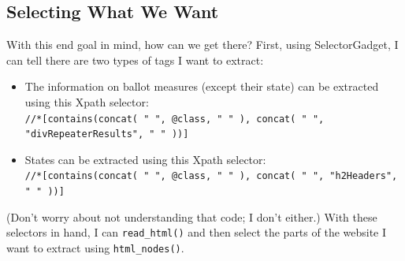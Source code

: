 \documentclass{article}\usepackage[]{graphicx}\usepackage[]{color}
\begin{document}
\subsection{Selecting What We Want}

With this end goal in mind, how can we get there? First, using SelectorGadget, I can tell there are two types of tags I want to extract:
\begin{itemize}
  \item The information on ballot measures (except their state) can be extracted using this Xpath selector:\\ 
  \verb!//*[contains(concat( " ", @class, " " ), concat( " ", "divRepeaterResults", " " ))]! 
  \item States can be extracted using this Xpath selector:\\
  \verb!//*[contains(concat( " ", @class, " " ), concat( " ", "h2Headers", " " ))]!
\end{itemize}
(Don't worry about not understanding that code; I don't either.) With these selectors in hand, I can \verb!read_html()! and then select the parts of the website I want to extract using \verb!html_nodes()!. 
\end{document}
